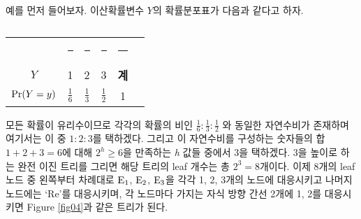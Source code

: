 \documentclass[11pt]{article}
\begin{document}
예를 먼저 들어보자. 이산확률변수 $Y$의 확률분포표가 다음과 같다고 하자.
\\
\begin{table}[h]
\centering
\begin{tabular}{cccccc}
\toprule
 & \rule{0.8cm}{0pt} & \rule{0.3cm}{0pt} & \rule{0.8cm}{0pt} & \rule{0.4cm}{0pt} \\[-\arraystretch\normalbaselineskip]
$Y$ & 1 & 2 & 3 & \textbf{계} \\
\midrule
$\textnormal{Pr}(Y=y)$ & $\displaystyle \frac{1}{6}$ & $\displaystyle \frac{1}{3}$ & $\displaystyle \frac{1}{2}$ & 1 \\
\bottomrule
\end{tabular}
\caption{}
\label{tab03}
\end{table}

\noindent 모든 확률이 유리수이므로 각각의 확률의 비인 $\frac{1}{6}:\frac{1}{3}:\frac{1}{2}$ 와 동일한 자연수비가 존재하며 여기서는 이 중 $1:2:3$를 택하겠다. 그리고 이 자연수비를 구성하는 숫자들의 합 $1+2+3=6$에 대해 $2^{h} \ge 6$을 만족하는 \textit{h} 값들 중에서 3을 택하겠다. 3을 높이로 하는 완전 이진 트리를 그리면 해당 트리의 leaf 개수는 총 $2^{3}=8$개이다. 이제 8개의 leaf 노드 중 왼쪽부터 차례대로 $\textnormal{E}_{1}$, $\textnormal{E}_{2}$, $\textnormal{E}_{3}$을 각각 1, 2, 3개의 노드에 대응시키고 나머지 노드에는 `Re'를 대응시키며, 각 노드마다 가지는 자식 방향 간선 2개에 1, 2를 대응시키면 Figure \ref{fig04}과 같은 트리가 된다.
\\
\end{document}
